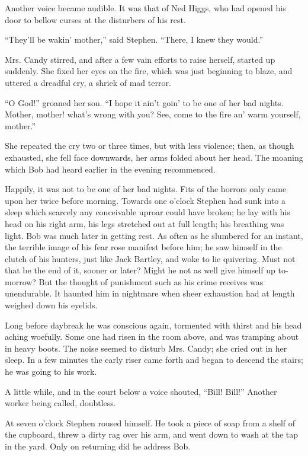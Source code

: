 Another voice became audible. It was that of Ned Higgs, who had opened
his door to bellow curses at the disturbers of his rest.

``They'll be wakin' mother,'' said Stephen. ``There, I knew they
would.''

Mrs. Candy stirred, and after a few vain efforts to raise herself,
started up suddenly. She fixed her eyes on the fire, which was just
beginning to blaze, and uttered a dreadful cry, a shriek of mad terror.

``O God!'' groaned her son. ``I hope it ain't goin' to be one of her bad
nights. Mother, mother! what's wrong with you? See, come to the fire an'
warm yourself, mother.''

She repeated the cry two or three times, but with less violence; then,
as though exhausted, she fell face downwards, her arms folded about her
head. The moaning which Bob had heard earlier in the evening
recommenced.

Happily, it was not to be one of her bad nights. Fits of the horrors
only came upon her twice before morning. Towards one o'clock Stephen had
sunk into a sleep which scarcely any conceivable uproar could have
broken; he {\protect\hypertarget{205}{}{}}lay with his head on his right
arm, his legs stretched out at full length; his breathing was light. Bob
was much later in getting rest. As often as he slumbered for an instant,
the terrible image of his fear rose manifest before him; he saw himself
in the clutch of his hunters, just like Jack Bartley, and woke to lie
quivering. Must not that be the end of it, sooner or later? Might he not
as well give himself up to-morrow? But the thought of punishment such as
his crime receives was unendurable. It haunted him in nightmare when
sheer exhaustion had at length weighed down his eyelids.

Long before daybreak he was conscious again, tormented with thirst and
his head aching woefully. Some one had risen in the room above, and was
tramping about in heavy boots. The noise seemed to disturb Mrs. Candy;
she cried out in her sleep. In a few minutes the early riser came forth
and began to descend the stairs; he was going to his work.

A little while, and in the court below a voice shouted, ``Bill! Bill!''
Another worker being called, doubtless.

At seven o'clock Stephen roused himself.
{\protect\hypertarget{206}{}{}}He took a piece of soap from a shelf of
the cupboard, threw a dirty rag over his arm, and went down to wash at
the tap in the yard. Only on returning did he address Bob.

